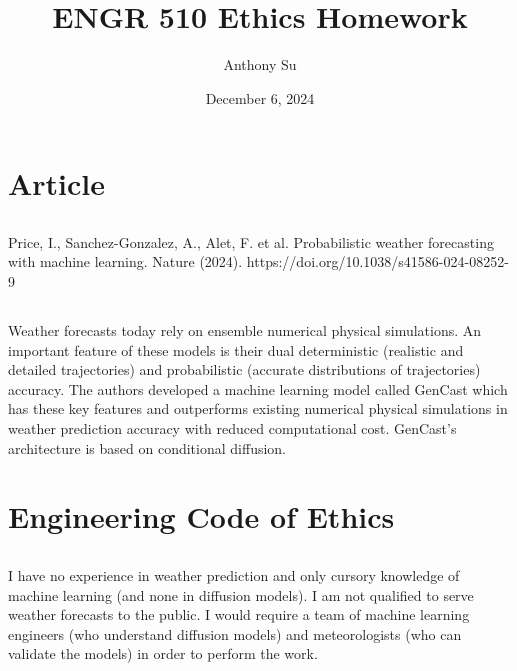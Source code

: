 \documentclass[11pt]{article}
\title{ENGR 510 Ethics Homework}
\author{Anthony Su}
\date{December 6, 2024}
\begin{document}
\thispagestyle{plain}
\maketitle


\section{Article}

\subsection{} %
Price, I., Sanchez-Gonzalez, A., Alet, F. et al. Probabilistic weather forecasting with machine learning. Nature (2024). https://doi.org/10.1038/s41586-024-08252-9

\subsection{} %
Weather forecasts today rely on ensemble numerical physical simulations. An
important feature of these models is their dual deterministic (realistic and
detailed trajectories) and probabilistic (accurate distributions of
trajectories) accuracy. The authors developed a machine learning model called
GenCast which has these key features and outperforms existing numerical physical
simulations in weather prediction accuracy with reduced computational cost.
GenCast's architecture is based on conditional diffusion.

\section{Engineering Code of Ethics}

\subsection{} %
I have no experience in weather prediction and only cursory knowledge of machine
learning (and none in diffusion models). I am not qualified to serve weather
forecasts to the public. I would require a team of machine learning engineers
(who understand diffusion models) and meteorologists (who can validate the
models) in order to perform the work.
\end{document}

